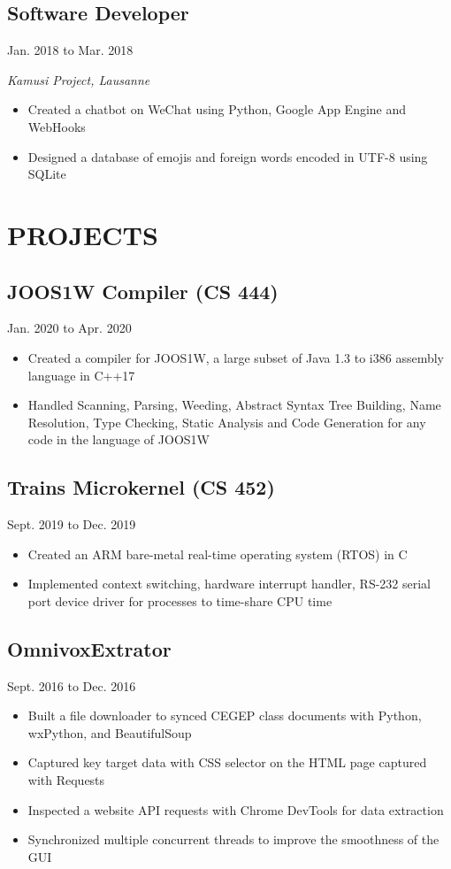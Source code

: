 \documentclass[11pt]{extarticle}
\begin{document}
\subsection*{Software Developer} \hfill Jan. 2018 to Mar. 2018

\textit{Kamusi Project, Lausanne}
\begin{itemize}
  \item Created a chatbot on WeChat using Python, Google App Engine and WebHooks
  \item Designed a database of emojis and foreign words encoded in UTF-8 using SQLite
\end{itemize}


\section*{PROJECTS}
\subsection*{JOOS1W Compiler (CS 444)} \hfill Jan. 2020 to Apr. 2020
\begin{itemize}
  \item Created a compiler for JOOS1W, a large subset of Java 1.3 to i386 assembly language in C++17
  \item Handled Scanning, Parsing, Weeding, Abstract Syntax Tree Building, Name Resolution, Type Checking, Static Analysis and Code Generation for any code in the language of JOOS1W
\end{itemize}

\subsection*{Trains Microkernel (CS 452)} \hfill Sept. 2019 to Dec. 2019
\begin{itemize}
  \item Created an ARM bare-metal real-time operating system (RTOS) in C
  \item Implemented context switching, hardware interrupt handler, RS-232 serial port device driver for processes to time-share CPU time
\end{itemize}

\subsection*{OmnivoxExtrator} \hfill Sept. 2016 to Dec. 2016
\begin{itemize}
  \item Built a file downloader to synced CEGEP class documents with Python, wxPython, and BeautifulSoup
  \item Captured key target data with CSS selector on the HTML page captured with Requests
  \item Inspected a website API requests with Chrome DevTools for data extraction
  \item Synchronized multiple concurrent threads to improve the smoothness of the GUI
\end{itemize}
\end{document}
